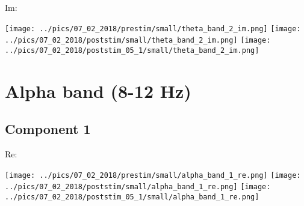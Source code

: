 \documentclass{article}
\begin{document}
Im:

\hspace{0.5cm}
\texttt{[image: ../pics/07\_02\_2018/prestim/small/theta\_band\_2\_im.png]}
\hspace{0.5cm}
\texttt{[image: ../pics/07\_02\_2018/poststim/small/theta\_band\_2\_im.png]}
\hspace{0.5cm}
\texttt{[image: ../pics/07\_02\_2018/poststim\_05\_1/small/theta\_band\_2\_im.png]}




\section{Alpha band (8-12 Hz)}
\subsection*{Component 1}
Re:

\hspace{0.5cm}
\texttt{[image: ../pics/07\_02\_2018/prestim/small/alpha\_band\_1\_re.png]}
\hspace{0.5cm}
\texttt{[image: ../pics/07\_02\_2018/poststim/small/alpha\_band\_1\_re.png]}
\hspace{0.5cm}
\texttt{[image: ../pics/07\_02\_2018/poststim\_05\_1/small/alpha\_band\_1\_re.png]}
\end{document}
